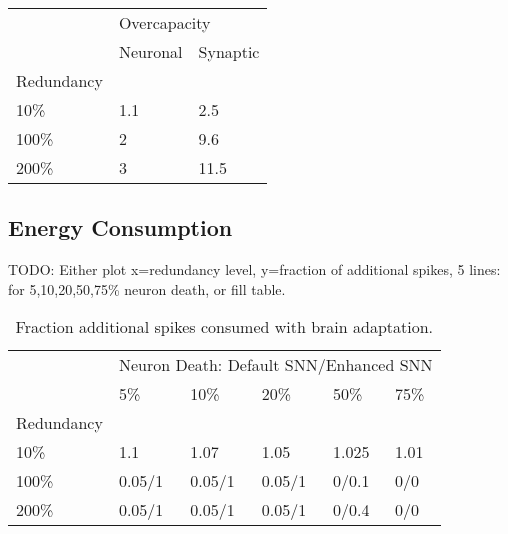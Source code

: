 \begin{table}[H]
\begin{tabular}{lll}
           & \multicolumn{2}{l}{Overcapacity} \\
           & Neuronal     & Synaptic                   \\
Redundancy &              &                            \\
10\%       & 1.1          & 2.5                        \\
100\%      & 2            & 9.6                          \\
200\%      & 3            & 11.5                         
\end{tabular}
\end{table}

\subsection{Energy Consumption}\label{subsec:results_energy_consumption}
TODO: Either plot x=redundancy level, y=fraction of additional spikes, 5 lines: for 5,10,20,50,75\% neuron death, or fill table.
\begin{table}[H]
\caption{Fraction additional spikes consumed with brain adaptation.}
\begin{tabular}{llllll}
           & \multicolumn{5}{l}{Neuron Death: Default SNN/Enhanced SNN} \\
           & 5\%    & 10\%    & 20\%    & 50\%    & 75\%    \\
Redundancy &        &         &         &         &         \\
10\%       & 1.1    & 1.07     & 1.05       & 1.025       & 1.01       \\
100\%      & 0.05/1      & 0.05/1       & 0.05/1       & 0/0.1     & 0/0       \\
200\%      & 0.05/1      & 0.05/1       & 0.05/1       & 0/0.4     & 0/0      
\end{tabular}
\end{table}

